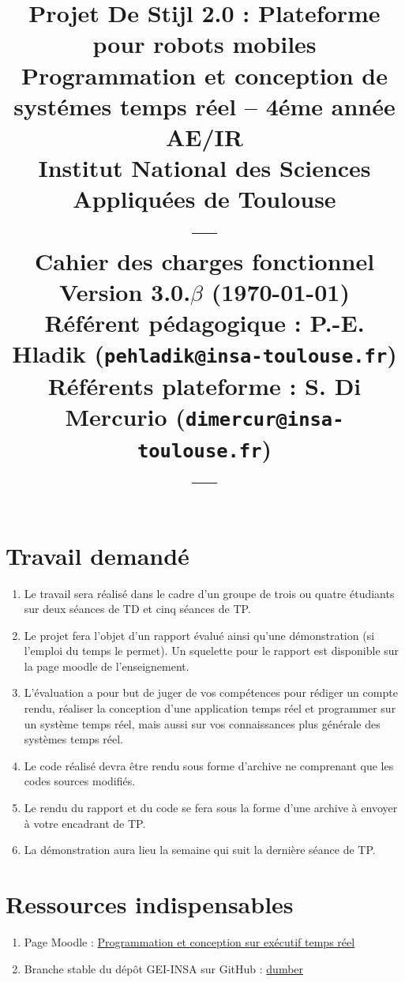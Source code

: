 \documentclass[11pt]{paper}
\title{{\Huge Projet De Stijl 2.0}
{\small : Plateforme pour robots mobiles}\\
{\scriptsize Programmation et conception de systémes temps réel -- 4éme année AE/IR}\\
{\scriptsize Institut National des Sciences Appliquées de Toulouse}\\
---\\
Cahier des charges fonctionnel \\
{\large Version 3.0.$\beta$ (\today)}\\
{\scriptsize Référent pédagogique : P.-E. Hladik (\texttt{pehladik@insa-toulouse.fr})}\\
{\scriptsize Référents plateforme : S. Di Mercurio (\texttt{dimercur@insa-toulouse.fr})}\\
---
}
\begin{document}
\maketitle


\section*{Travail demandé}

\begin{enumerate}
	\item Le travail sera réalisé dans le cadre d'un groupe de trois ou quatre étudiants sur deux séances de TD et cinq séances de TP.
	\item Le projet fera l'objet d'un rapport évalué ainsi qu'une démonstration (si l'emploi du temps le permet). Un squelette pour le rapport est disponible sur la page moodle de l'enseignement.
	\item L'évaluation a pour but de juger de vos compétences pour rédiger un compte rendu, réaliser la conception d'une application temps réel et programmer sur un système temps réel, mais aussi sur vos connaissances plus générale des systèmes temps réel.
	\item Le code réalisé devra être rendu sous forme d'archive ne comprenant que les codes sources modifiés.
	\item Le rendu du rapport et du code se fera sous la forme d'une archive à envoyer à votre encadrant de TP.
	\item La démonstration aura lieu la semaine qui suit la dernière séance de TP.
\end{enumerate}

\section*{Ressources indispensables}
\begin{enumerate}
	\item Page Moodle : \href{https://moodle.insa-toulouse.fr/course/view.php?id=235}{Programmation et conception sur exécutif temps réel}
	\item Branche stable du dépôt GEI-INSA sur GitHub : \href{https://github.com/INSA-GEI/dumber/tree/stable}{dumber}
\end{enumerate}

\newpage


\newpage


\newpage

\end{document}
